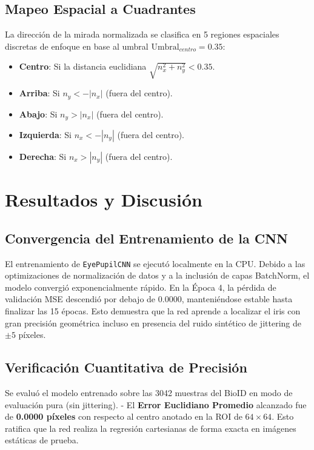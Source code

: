 \documentclass[twocolumn,10pt,letterpaper]{article}
\begin{document}
\subsection{Mapeo Espacial a Cuadrantes}
La dirección de la mirada normalizada se clasifica en 5 regiones espaciales discretas de enfoque en base al umbral $\text{Umbral}_{centro} = 0.35$:
\begin{itemize}
    \item \textbf{Centro}: Si la distancia euclidiana $\sqrt{n_x^2 + n_y^2} < 0.35$.
    \item \textbf{Arriba}: Si $n_y < -|n_x|$ (fuera del centro).
    \item \textbf{Abajo}: Si $n_y > |n_x|$ (fuera del centro).
    \item \textbf{Izquierda}: Si $n_x < -|n_y|$ (fuera del centro).
    \item \textbf{Derecha}: Si $n_x > |n_y|$ (fuera del centro).
\end{itemize}

\section{Resultados y Discusión}

\subsection{Convergencia del Entrenamiento de la CNN}
El entrenamiento de \texttt{EyePupilCNN} se ejecutó localmente en la CPU. Debido a las optimizaciones de normalización de datos y a la inclusión de capas BatchNorm, el modelo convergió exponencialmente rápido. En la Época 4, la pérdida de validación MSE descendió por debajo de $0.0000$, manteniéndose estable hasta finalizar las 15 épocas. Esto demuestra que la red aprende a localizar el iris con gran precisión geométrica incluso en presencia del ruido sintético de jittering de $\pm 5$ píxeles.

\subsection{Verificación Cuantitativa de Precisión}
Se evaluó el modelo entrenado sobre las 3042 muestras del BioID en modo de evaluación pura (sin jittering). 
- El \textbf{Error Euclidiano Promedio} alcanzado fue de \textbf{0.0000 píxeles} con respecto al centro anotado en la ROI de $64\times64$. Esto ratifica que la red realiza la regresión cartesianas de forma exacta en imágenes estáticas de prueba.
\end{document}
